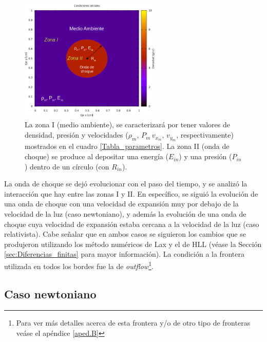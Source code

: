 \documentclass[12pt,a4paper]{book}
\begin{document}
\begin{figure}
\centering
\includegraphics[width=0.6\textwidth]{./Figuras/Pruebas/Prueba_onda_choque/prueba_example}
\caption{\label{fig:onda_choque_example}La zona I (medio ambiente), se caracterizará por tener valores de densidad, presión y velocidades ($\rho_m, \, P_m \, v_{x_m}, \, v_{y_m}$, respectivamente) mostrados en el cuadro \ref{Tabla_parametros}. La zona II (onda de choque) se produce al depositar una energía ($E_{in}$) y una presión ($P_{in}$) dentro de un círculo (con $R_{in}$).}
\end{figure}

La onda de choque se dejó evolucionar con el paso del tiempo, y se analizó la interacción que hay entre las zonas I y II. En específico, se siguió la evolución de una onda de choque con una velocidad de expansión muy por debajo de la velocidad de la luz (caso newtoniano), y además la evolución de una onda de choque cuya velocidad de expansión estaba cercana a la velocidad de la luz (caso relativista). Cabe señalar que en ambos casos se siguieron los cambios que se produjeron utilizando los método numéricos de Lax y el de HLL (véase la Sección \ref{sec:Diferencias_finitas} para mayor información). La condición a la frontera utilizada en todos los bordes fue la de \emph{outflow}\footnote{Para ver más detalles acerca de esta frontera y/o de otro tipo de fronteras veáse el apéndice \ref{aped.B}}. 





\subsection{Caso newtoniano} \label{subs:caso_newtoniano}
\end{document}

